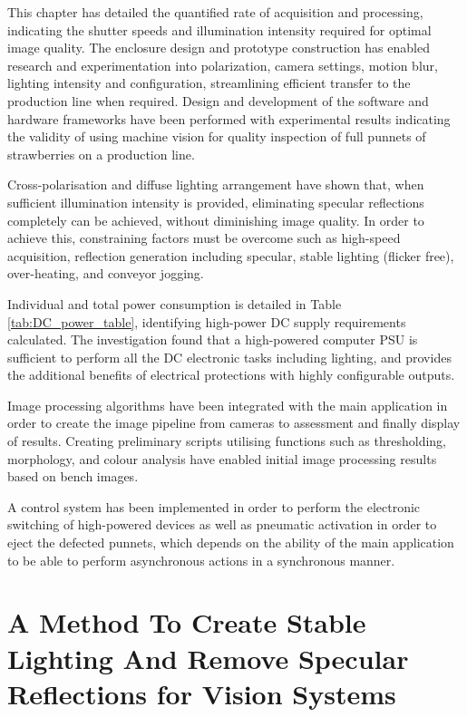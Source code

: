 \documentclass[fleqn,twoside,12pt]{report}
\begin{document}
This chapter has detailed the quantified rate of acquisition and processing, indicating the shutter speeds and illumination intensity required for optimal image quality. The enclosure design and prototype construction has enabled research and experimentation into polarization, camera settings, motion blur, lighting intensity and configuration, streamlining efficient transfer to the production line when required. Design and development of the software and hardware frameworks have been performed with experimental results indicating the validity of using machine vision for quality inspection of full punnets of strawberries on a production line. 

Cross-polarisation and diffuse lighting arrangement have shown that, when sufficient illumination intensity is provided, eliminating specular reflections completely can be achieved, without diminishing image quality. In order to achieve this, constraining factors must be overcome such as high-speed acquisition, reflection generation including specular, stable lighting (flicker free), over-heating, and conveyor jogging. 

Individual and total power consumption is detailed in Table \ref{tab:DC_power_table}, identifying high-power DC supply requirements calculated. The investigation found that a high-powered computer PSU is sufficient to perform all the DC electronic tasks including lighting, and provides the additional benefits of electrical protections with highly configurable outputs.

Image processing algorithms have been integrated with the main application in order to create the image pipeline from cameras to assessment and finally display of results. Creating preliminary scripts utilising functions such as thresholding, morphology, and colour analysis have enabled initial image processing results based on bench images.


A control system has been implemented in order to perform the electronic switching of high-powered devices as well as pneumatic activation in order to eject the defected punnets, which depends on the ability of the main application to be able to perform asynchronous actions in a synchronous manner.




\newpage
\chapter{A Method To Create Stable Lighting And Remove Specular Reflections for Vision Systems}
\label{sec:paper_1}
\end{document}

